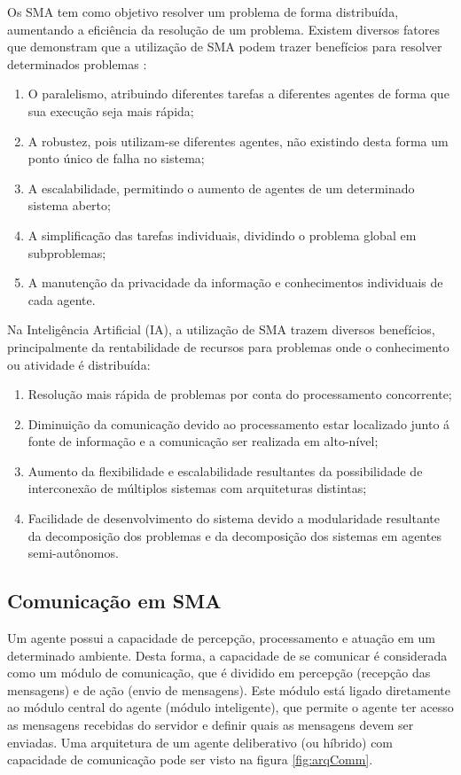 Os SMA tem como objetivo resolver um problema de forma distribuída, aumentando a eficiência da resolução de um problema. Existem 
diversos fatores que demonstram que a utilização de SMA podem trazer benefícios para resolver determinados problemas \cite{stone}:

\begin{enumerate}
 \item O paralelismo, atribuindo diferentes tarefas a diferentes agentes de forma que sua execução seja mais rápida;
 \item A robustez, pois utilizam-se diferentes agentes, não existindo desta forma um ponto único de falha no sistema;
 \item A escalabilidade, permitindo o aumento de agentes de um determinado sistema aberto;
 \item A simplificação das tarefas individuais, dividindo o problema global em subproblemas;
 \item A manutenção da privacidade da informação e conhecimentos individuais de cada agente.
\end{enumerate}

Na Inteligência Artificial (IA), a utilização de SMA trazem diversos benefícios, principalmente da rentabilidade de recursos para 
problemas onde o conhecimento ou atividade é distribuída:

\begin{enumerate}
 \item Resolução mais rápida de problemas por conta do processamento concorrente;
 \item Diminuição da comunicação devido ao processamento estar localizado junto á fonte de informação e a comunicação ser realizada em alto-nível;
 \item Aumento da flexibilidade e escalabilidade resultantes da possibilidade de interconexão de múltiplos sistemas com arquiteturas
 distintas;
 \item Facilidade de desenvolvimento do sistema devido a modularidade resultante da decomposição dos problemas e da decomposição dos 
 sistemas em agentes semi-autônomos.
\end{enumerate}

\subsection{Comunicação em SMA}
\label{subsec:comsma}
Um agente possui a capacidade de percepção, processamento e atuação em um determinado ambiente. Desta forma, a capacidade de se 
comunicar é considerada como um módulo de comunicação, que é dividido em percepção (recepção das mensagens) e de ação (envio de mensagens).
Este módulo está ligado diretamente ao módulo central do agente (módulo inteligente), que permite o agente ter acesso as mensagens 
recebidas do servidor e definir quais as mensagens devem ser enviadas. Uma arquitetura de um agente deliberativo (ou híbrido) com capacidade 
de comunicação pode ser visto na figura \ref{fig:arqComm}.


